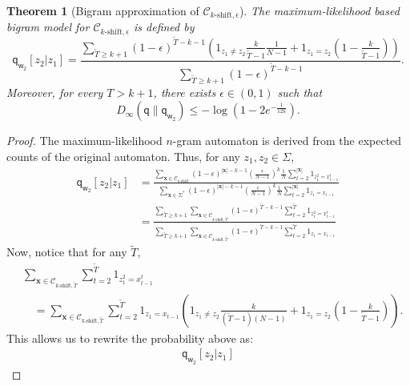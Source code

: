 \documentclass{article}
\newcommand{\sC}{\mathscr C}
\newcommand{\bx}{{\mathbf x}}
\newcommand{\sfq}{{\mathsf q}}
\newcommand{\sfw}{{\mathsf w}}
\newcommand{\e}{\epsilon}
\newtheorem{theorem}{Theorem}
\begin{document}
\begin{theorem}[Bigram approximation of $\sC_{\text{$k$-shift},\e}$]
  \label{th:bigramkshifteps}
  The maximum-likelihood based bigram model for $\sC_{\text{$k$-shift},\e}$ is
  defined by 
  $$\sfq_{\sfw_2}[z_2 | z_1] = \frac{ \sum_{\tilde{T} \geq k +1 }  (1-\e)^{\tilde{T}-k-1}
  \left(1_{z_1 \neq z_2} \frac{k}{\tilde{T}-1} \frac{1}{N-1} + 1_{z_1 = z_2} \left( 1- \frac{k}{\tilde{T}-1}\right) \right)
  }{ \sum_{\tilde{T} \geq k + 1} (1-\e)^{\tilde{T}-k-1}}.$$
  Moreover, for every $T > k + 1$, there exists $\e \in (0,1)$ such that
  $$D_\infty(\sfq \| \sfq_{\sfw_2}) \leq - \log \left( 1 - 2e^{-\frac{1}{12k}} \right).$$
\end{theorem}
\begin{proof}
The maximum-likelihood $n$-gram automaton
is derived from the expected counts of the original automaton. Thus, 
for any $z_1, z_2 \in \Sigma$,
\begin{align*}
\sfq_{\sfw_2}[z_2 | z_1] 
  & = \frac{\sum_{\bx \in \sC_{\text{$k$-shift}}} (1-\e)^{|\bx|-k-1} \left(\frac{\e}{N-1}\right)^k 
  \frac{1}{N} \sum_{t=2}^{|\bx|} 1_{z_1^2 = x_{t-1}^t} }{\sum_{\bx \in \Sigma^*} 
  (1-\e)^{|\bx|-k-1} \left(\frac{\e}{N-1}\right)^k \frac{1}{N} \sum_{t=2}^{|\bx|} 
  1_{z_1 = x_{t-1}}} \\
  & = \frac{\sum_{\tilde{T} \geq k +1 } \sum_{\bx \in \sC_{\text{$k$-shift},\tilde{T}}} (1-\e)^{\tilde{T}-k-1} \sum_{t=2}^{\tilde{T}} 
  1_{z_1^2 = x_{t-1}^t} }{\sum_{\tilde{T} \geq k + 1}\sum_{\bx \in  \sC_{\text{$k$-shift},\tilde{T}}} (1-\e)^{\tilde{T}-k-1}  
  \sum_{t=2}^{\tilde{T}} 1_{z_1 = x_{t-1}}} 
\end{align*}
Now, notice that for any $\tilde{T}$, 
\begin{align*}
  &\sum_{\bx \in \sC_{\text{$k$-shift},\tilde{T}}}  
  \sum_{t=2}^{\tilde{T}} 1_{z_1^2 = x_{t-1}^t} \\
  &\quad = \sum_{\bx \in \sC_{\text{$k$-shift},\tilde{T}}} 
  \sum_{t=2}^{\tilde{T}}  1_{z_1 = x_{t-1}} 
  \left(1_{z_1 \neq z_2} \frac{k}{(\tilde{T}-1)(N-1)}  + 1_{z_1 = z_2} \left( 1- \frac{k}{\tilde{T}-1}\right) \right).
\end{align*}
This allows us to rewrite the probability above as:
\begin{align*}
  \sfq_{\sfw_2}[z_2 | z_1]

\end{align*}
\end{proof}
\end{document}
